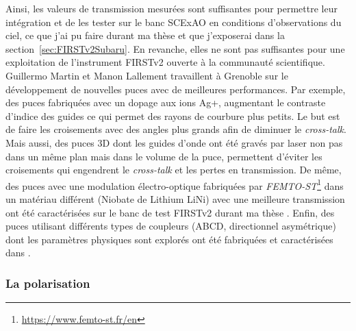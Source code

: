 Ainsi, les valeurs de transmission mesurées sont suffisantes pour permettre leur intégration et de les tester sur le banc \ac{SCExAO} en conditions d'observations du ciel, ce que j'ai pu faire durant ma thèse et que j'exposerai dans la section~\ref{sec:FIRSTv2Subaru}. En revanche, elles ne sont pas suffisantes pour une exploitation de l'instrument \ac{FIRSTv2} ouverte à la communauté scientifique. Guillermo Martin et Manon Lallement travaillent à Grenoble sur le développement de nouvelles puces avec de meilleures performances. Par exemple, des puces fabriquées avec un dopage aux ions Ag+, augmentant le contraste d'indice des guides ce qui permet des rayons de courbure plus petits. Le but est de faire les croisements avec des angles plus grands afin de diminuer le \textit{cross-talk}. Mais aussi, des puces 3D \citep{martin2022a} dont les guides d'onde ont été gravés par laser non pas dans un même plan mais dans le volume de la puce, permettent d'éviter les croisements qui engendrent le \textit{cross-talk} et les pertes en transmission. De même, des puces avec une modulation électro-optique fabriquées par \textit{FEMTO-ST}\footnote{\url{https://www.femto-st.fr/en}} dans un matériau différent (Niobate de Lithium LiNi) avec une meilleure transmission ont été caractérisées sur le banc de test \ac{FIRSTv2} durant ma thèse \citep{martin2022b}. Enfin, des puces utilisant différents types de coupleurs (ABCD, directionnel asymétrique) dont les paramètres physiques sont explorés ont été fabriquées et caractérisées dans \cite{lallement2022}.


\subsubsection{La polarisation}

